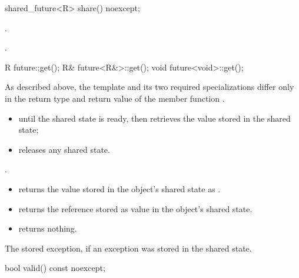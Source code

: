 %
\begin{itemdecl}
shared_future<R> share() noexcept;
\end{itemdecl}

\begin{itemdescr}
\pnum
\ensures
{}.

\pnum
\returns
{}.
\end{itemdescr}

%
\begin{itemdecl}
R future::get();
R& future<R&>::get();
void future<void>::get();
\end{itemdecl}

\begin{itemdescr}
\pnum
\begin{note}
As described above, the template and its two required specializations differ only in
the return type and return value of the member function .
\end{note}

\pnum
\effects
\begin{itemize}
\item {} until the shared state is ready, then retrieves the
value stored in the shared state;
\item releases any shared state.
\end{itemize}

\pnum
\ensures
{}.

\pnum
\returns
\begin{itemize}
\item
{} returns the value  stored in the object's shared state as
.

\item
{} returns the reference stored as value in the object's shared state.

\item
{} returns nothing.
\end{itemize}

\pnum
\throws
The stored exception, if an exception was stored in the shared state.
\end{itemdescr}

%
\begin{itemdecl}
bool valid() const noexcept;
\end{itemdecl}

